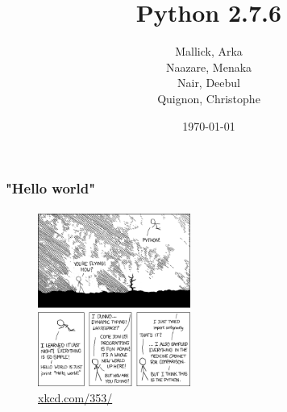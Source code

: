 \documentclass{beamer}
\begin{document}
\title{Python 2.7.6}
\subtitle{}
\author{
  Mallick, Arka\\
  Naazare, Menaka \\
  Nair, Deebul\\
  Quignon, Christophe \\
} 
\date{\today}

\begin{frame}
\titlepage
\end{frame}





\begin{frame}
\frametitle{"Hello world"}
\framesubtitle{}
 
 \begin{figure}
 \center
 \includegraphics[width=5cm]{img/python.png}
 \caption{\href{http://xkcd.com/353/}{xkcd.com/353/}}
\end{figure}
 
\end{frame}
\end{document}
